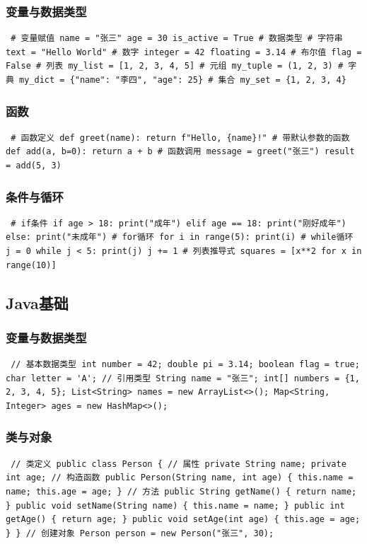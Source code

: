 \subsubsection{变量与数据类型}\label{ux53d8ux91cfux4e0eux6570ux636eux7c7bux578b-1} \begin{verbatim} # 变量赋值 name = "张三" age = 30 is_active = True # 数据类型 # 字符串 text = "Hello World" # 数字 integer = 42 floating = 3.14 # 布尔值 flag = False # 列表 my_list = [1, 2, 3, 4, 5] # 元组 my_tuple = (1, 2, 3) # 字典 my_dict = {"name": "李四", "age": 25} # 集合 my_set = {1, 2, 3, 4} \end{verbatim} \subsubsection{函数}\label{ux51fdux6570-1} \begin{verbatim} # 函数定义 def greet(name): return f"Hello, {name}!" # 带默认参数的函数 def add(a, b=0): return a + b # 函数调用 message = greet("张三") result = add(5, 3) \end{verbatim} \subsubsection{条件与循环}\label{ux6761ux4ef6ux4e0eux5faaux73af-1} \begin{verbatim} # if条件 if age > 18: print("成年") elif age == 18: print("刚好成年") else: print("未成年") # for循环 for i in range(5): print(i) # while循环 j = 0 while j < 5: print(j) j += 1 # 列表推导式 squares = [x**2 for x in range(10)] \end{verbatim} \subsection{Java基础}\label{javaux57faux7840} \subsubsection{变量与数据类型}\label{ux53d8ux91cfux4e0eux6570ux636eux7c7bux578b-2} \begin{verbatim} // 基本数据类型 int number = 42; double pi = 3.14; boolean flag = true; char letter = 'A'; // 引用类型 String name = "张三"; int[] numbers = {1, 2, 3, 4, 5}; List<String> names = new ArrayList<>(); Map<String, Integer> ages = new HashMap<>(); \end{verbatim} \subsubsection{类与对象}\label{ux7c7bux4e0eux5bf9ux8c61} \begin{verbatim} // 类定义 public class Person { // 属性 private String name; private int age; // 构造函数 public Person(String name, int age) { this.name = name; this.age = age; } // 方法 public String getName() { return name; } public void setName(String name) { this.name = name; } public int getAge() { return age; } public void setAge(int age) { this.age = age; } } // 创建对象 Person person = new Person("张三", 30); \end{verbatim} 